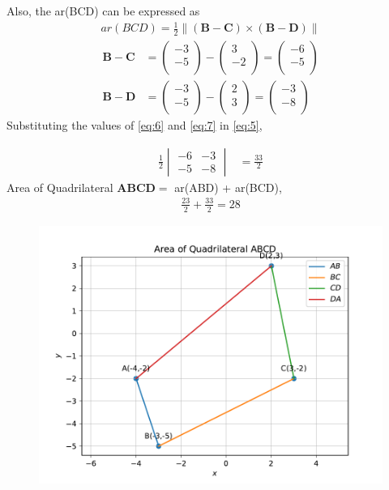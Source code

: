 \documentclass[12pt]{article}
\newcommand{\mydet}[1]{\ensuremath{\begin{vmatrix}#1\end{vmatrix}}}
\providecommand{\brak}[1]{\ensuremath{\left(#1\right)}}
\providecommand{\norm}[1]{\left\lVert#1\right\rVert}
\newcommand{\myvec}[1]{\ensuremath{\begin{pmatrix}#1\end{pmatrix}}}
\let\vec\mathbf
\begin{document}
\begin{enumerate}
		Also, the ar(BCD) can be expressed as
  \begin{align}
	  ar(BCD)=\frac{1}{2} \norm{\brak{\vec{B}-\vec{C}}  \times 
   \brak{\vec{B}- \vec{D}}} \label{eq:5}
\end{align}
\begin{align}
	\vec{B}- \vec{C} &= \myvec{-3\\-5\\}-\myvec{3\\-2\\}=\myvec{-6\\-5\\}\label{eq:6} \\
	  \vec{B}- \vec{D} &= \myvec{-3\\-5\\}-\myvec{2\\3\\}=\myvec{-3\\-8\\}\label{eq:7} 
  \end{align}
		Substituting the values of \eqref{eq:6} and \eqref{eq:7} in \eqref{eq:5},

		\begin{align}
	\frac{1}{2}\mydet{-6 & -3\\-5 & -8}  
	&=	\frac{33}{2}
\end{align}
		Area of Quadrilateral $\vec{A}\vec{B}\vec{C}\vec{D} = $ ar(ABD) +  ar(BCD),
\begin{align}
	\frac{23}{2}+\frac{33}{2} = 28
\end{align}
\begin{figure}[!h]
 \begin{center}
  \includegraphics[width=\columnwidth]{figs/fig.pdf}
 \end{center}
\caption{}
\label{fig:Fig1}
\end{figure}
\end{enumerate}
\end{document}
